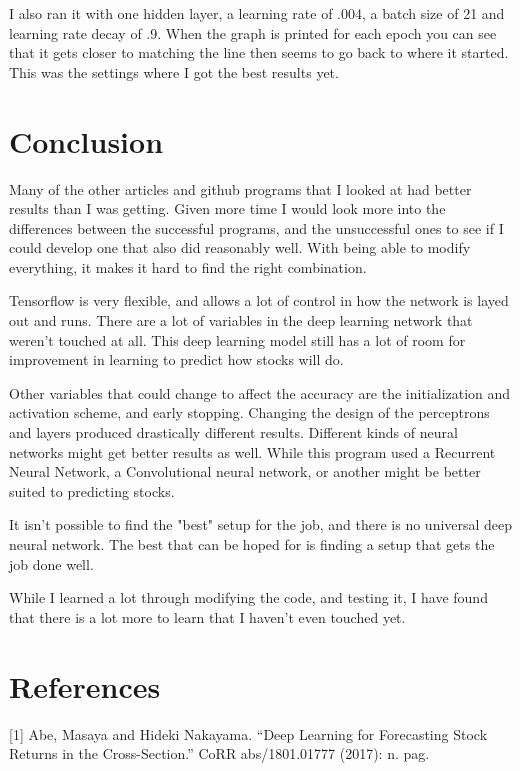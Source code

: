 \documentclass{article}
\begin{document}
I also ran it with one hidden layer, a learning rate of .004, a batch size of 21 and learning rate decay of .9.
When the graph is printed for each epoch you can see that it gets closer to matching the line then seems to go back to where it started.
This was the settings where I got the best results yet.


\section{Conclusion}

Many of the other articles and github programs that I looked at had better results than I was getting.
Given more time I would look more into the differences between the successful programs, and the unsuccessful ones to see if I could develop one that also did reasonably well. 
With being able to modify everything, it makes it hard to find the right combination.


Tensorflow is very flexible, and allows a lot of control in how the network is layed out and runs.
There are a lot of variables in the deep learning network that weren't touched at all. 
This deep learning model still has a lot of room for improvement in learning to predict how stocks will do.

Other variables that could change to affect the accuracy are the initialization and activation scheme, and early stopping.
Changing the design of the perceptrons and layers produced drastically different results. 
Different kinds of neural networks might get better results as well.
While this program used a Recurrent Neural Network, a Convolutional neural network, or another might be better suited to predicting stocks. 

It isn't possible to find the "best" setup for the job, and there is no universal deep neural network.
The best that can be hoped for is finding a setup that gets the job done well.

While I learned a lot through modifying the code, and testing it, I have found that there is a lot more to learn that I haven't even touched yet. 



\section*{References}
\medskip

\small

[1] Abe, Masaya and Hideki Nakayama. “Deep Learning for Forecasting Stock Returns in the Cross-Section.” CoRR abs/1801.01777 (2017): n. pag.
\end{document}
